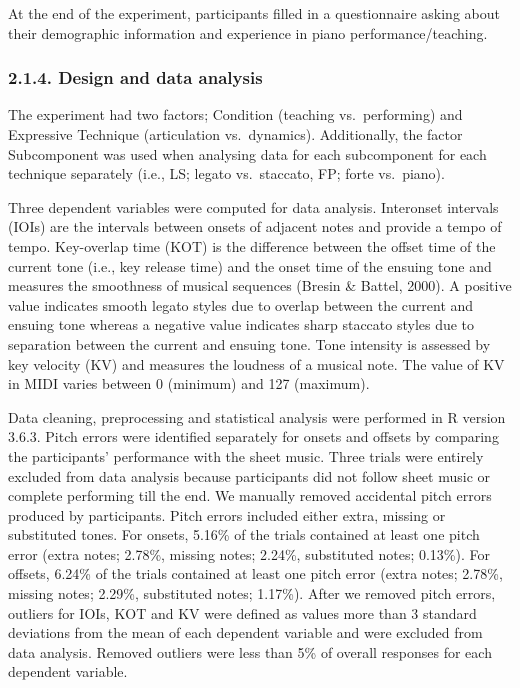 \documentclass[
  english,
  man,floatsintext]{apa6}
\begin{document}
At the end of the experiment, participants filled in a questionnaire asking about their demographic information and experience in piano performance/teaching.

\hypertarget{design-and-data-analysis}{%
\subsubsection{2.1.4. Design and data analysis}\label{design-and-data-analysis}}

The experiment had two factors; Condition (teaching vs.~performing) and Expressive Technique (articulation vs.~dynamics). Additionally, the factor Subcomponent was used when analysing data for each subcomponent for each technique separately (i.e., LS; legato vs.~staccato, FP; forte vs.~piano).

Three dependent variables were computed for data analysis. Interonset intervals (IOIs) are the intervals between onsets of adjacent notes and provide a tempo of tempo. Key-overlap time (KOT) is the difference between the offset time of the current tone (i.e., key release time) and the onset time of the ensuing tone and measures the smoothness of musical sequences (Bresin \& Battel, 2000). A positive value indicates smooth legato styles due to overlap between the current and ensuing tone whereas a negative value indicates sharp staccato styles due to separation between the current and ensuing tone. Tone intensity is assessed by key velocity (KV) and measures the loudness of a musical note. The value of KV in MIDI varies between 0 (minimum) and 127 (maximum).

Data cleaning, preprocessing and statistical analysis were performed in R version 3.6.3. Pitch errors were identified separately for onsets and offsets by comparing the participants' performance with the sheet music. Three trials were entirely excluded from data analysis because participants did not follow sheet music or complete performing till the end. We manually removed accidental pitch errors produced by participants. Pitch errors included either extra, missing or substituted tones. For onsets, 5.16\% of the trials contained at least one pitch error (extra notes; 2.78\%, missing notes; 2.24\%, substituted notes; 0.13\%). For offsets, 6.24\% of the trials contained at least one pitch error (extra notes; 2.78\%, missing notes; 2.29\%, substituted notes; 1.17\%). After we removed pitch errors, outliers for IOIs, KOT and KV were defined as values more than 3 standard deviations from the mean of each dependent variable and were excluded from data analysis. Removed outliers were less than 5\% of overall responses for each dependent variable.
\end{document}
